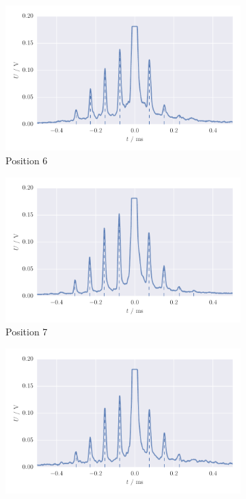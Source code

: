 \begin{figure}[H]
    \centering
    \begin{subfigure}[b]{\mpltw}
        \includegraphics[width=\textwidth]{figures/aperture_6b}
        \caption{Position 6}
        \label{}
    \end{subfigure}
    \begin{subfigure}[b]{\mpltw}
        \includegraphics[width=\textwidth]{figures/aperture_7b}
        \caption{Position 7}
        \label{}
    \end{subfigure}
    \begin{subfigure}[b]{\mpltw}
        \includegraphics[width=\textwidth]{figures/aperture_8b}

\end{subfigure}
\end{figure}

